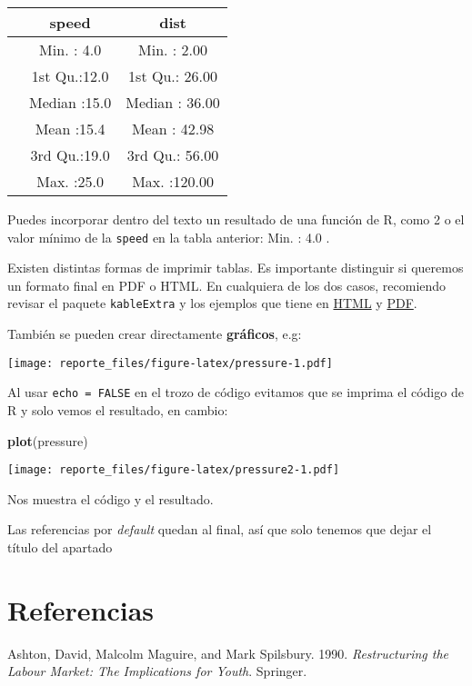 \documentclass[]{article}
\newenvironment{Shaded}{\begin{snugshade}}{\end{snugshade}}
\newcommand{\KeywordTok}[1]{\textcolor[rgb]{0.13,0.29,0.53}{\textbf{#1}}}
\newcommand{\NormalTok}[1]{#1}
\begin{document}
\begin{longtable}[]{@{}lcc@{}}
\toprule
& speed & dist\tabularnewline
\midrule
\endhead
& Min. : 4.0 & Min. : 2.00\tabularnewline
& 1st Qu.:12.0 & 1st Qu.: 26.00\tabularnewline
& Median :15.0 & Median : 36.00\tabularnewline
& Mean :15.4 & Mean : 42.98\tabularnewline
& 3rd Qu.:19.0 & 3rd Qu.: 56.00\tabularnewline
& Max. :25.0 & Max. :120.00\tabularnewline
\bottomrule
\end{longtable}

Puedes incorporar dentro del texto un resultado de una función de R,
como 2 o el valor mínimo de la \texttt{speed} en la tabla anterior: Min.
: 4.0 .

Existen distintas formas de imprimir tablas. Es importante distinguir si
queremos un formato final en PDF o HTML. En cualquiera de los dos casos,
recomiendo revisar el paquete \texttt{kableExtra} y los ejemplos que
tiene en
\href{https://haozhu233.github.io/kableExtra/awesome_table_in_html.html}{HTML}
y
\href{https://haozhu233.github.io/kableExtra/awesome_table_in_pdf.pdf}{PDF}.

También se pueden crear directamente \textbf{gráficos}, e.g:

\texttt{[image: reporte\_files/figure-latex/pressure-1.pdf]}

Al usar \texttt{echo\ =\ FALSE} en el trozo de código evitamos que se
imprima el código de R y solo vemos el resultado, en cambio:

\begin{Shaded}
\begin{Highlighting}[]
\KeywordTok{plot}\NormalTok{(pressure)}
\end{Highlighting}
\end{Shaded}

\texttt{[image: reporte\_files/figure-latex/pressure2-1.pdf]}

Nos muestra el código y el resultado.

Las referencias por \emph{default} quedan al final, así que solo tenemos
que dejar el título del apartado

\hypertarget{referencias}{%
\section*{Referencias}\label{referencias}}

\hypertarget{refs}{}
\leavevmode\hypertarget{ref-ashton_restructuring_1990}{}%
Ashton, David, Malcolm Maguire, and Mark Spilsbury. 1990.
\emph{Restructuring the Labour Market: The Implications for Youth}.
Springer.
\end{document}
